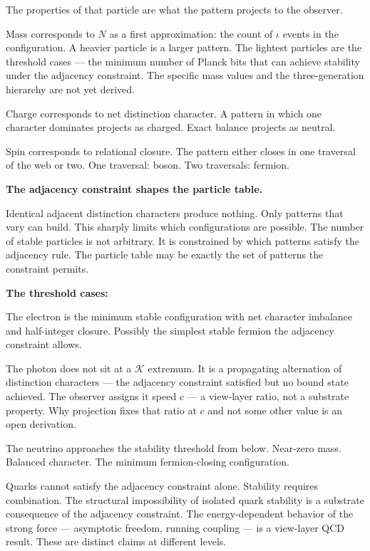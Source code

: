 \documentclass[11pt,letterpaper]{article}
\newcommand{\Kappa}{\mathcal{K}}
\begin{document}
The properties of that particle are what the pattern projects to the observer.

Mass corresponds to \(N\) as a first approximation: the count of \(\iota\) events in the configuration. A heavier particle is a larger pattern. The lightest particles are the threshold cases --- the minimum number of Planck bits that can achieve stability under the adjacency constraint. The specific mass values and the three-generation hierarchy are not yet derived.

Charge corresponds to net distinction character. A pattern in which one character dominates projects as charged. Exact balance projects as neutral.

Spin corresponds to relational closure. The pattern either closes in one traversal of the web or two. One traversal: boson. Two traversals: fermion.

\textbf{The adjacency constraint shapes the particle table.}

Identical adjacent distinction characters produce nothing. Only patterns that vary can build. This sharply limits which configurations are possible. The number of stable particles is not arbitrary. It is constrained by which patterns satisfy the adjacency rule. The particle table may be exactly the set of patterns the constraint permits.

\textbf{The threshold cases:}

The electron is the minimum stable configuration with net character imbalance and half-integer closure. Possibly the simplest stable fermion the adjacency constraint allows.

The photon does not sit at a \(\Kappa\) extremum. It is a propagating alternation of distinction characters --- the adjacency constraint satisfied but no bound state achieved. The observer assigns it speed \(c\) --- a view-layer ratio, not a substrate property. Why projection fixes that ratio at \(c\) and not some other value is an open derivation.

The neutrino approaches the stability threshold from below. Near-zero mass. Balanced character. The minimum fermion-closing configuration.

Quarks cannot satisfy the adjacency constraint alone. Stability requires combination. The structural impossibility of isolated quark stability is a substrate consequence of the adjacency constraint. The energy-dependent behavior of the strong force --- asymptotic freedom, running coupling --- is a view-layer QCD result. These are distinct claims at different levels.
\end{document}
